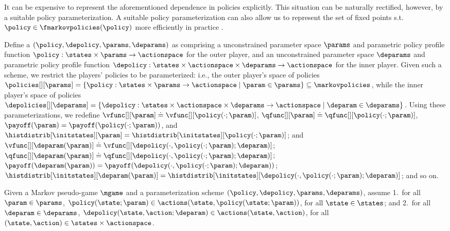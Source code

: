 It can be expensive to represent the aforementioned dependence in policies explicitly.
This situation can be naturally rectified, however, by a suitable policy parameterization. 
A suitable policy parameterization can also allow us to represent the set of fixed points s.t. $\policy \in \fmarkovpolicies (\policy)$ more efficiently in practice \cite{goktas2023generative}. 

Define a  $(\policy, \depolicy, \params, \deparams)$ as comprising a unconstrained parameter space $\params$ and parametric policy profile function $\policy: \states \times \params \to \actionspace$ for the outer player, and an unconstrained parameter space $\deparams$ and parametric policy profile function $\depolicy: \states\times \actionspace \times \deparams \to \actionspace$ for the inner player.
Given such a scheme, we restrict the players' policies to be parameterized: i.e., the outer player's space of policies $\policies[][\params] = \{ 
\policy: \states \times \params \to \actionspace \mid \param \in \params \} \subseteq \markovpolicies$, while the inner player's space of policies $\depolicies[][\deparams] = \{ \depolicy: \states\times \actionspace \times \deparams \to \actionspace
\mid \deparam \in \deparams \}$.
%
Using these parameterizations, we redefine $\vfunc[][\param] \doteq \vfunc[][{\policy (\cdot; \param)}]$, $\qfunc[][\param] \doteq \qfunc[][{\policy (\cdot; \param)}]$, $\payoff (\param) = \payoff ({\policy (\cdot; \param)})$, and $\histdistrib[\initstates][\param] = \histdistrib[\initstates][{\policy (\cdot; \param)}]$; and
$\vfunc[][\deparam(\param)] \doteq \vfunc[][{\depolicy (\cdot, \policy (\cdot; \param); \deparam)}]$; 
$\qfunc[][\deparam(\param)] \doteq \qfunc[][{\depolicy (\cdot, \policy (\cdot; \param); \deparam)}]$; $\payoff (\deparam(\param)) = \payoff ({\depolicy (\cdot, \policy (\cdot; \param); \deparam)})$; $\histdistrib[\initstates][\deparam(\param)] = \histdistrib[\initstates][{\depolicy (\cdot, \policy (\cdot; \param); \deparam)}]$; and so on.


\begin{assumption} 
\label{assum:param_min_max}
Given a Markov pseudo-game $\mgame$ and a parameterization scheme $(\policy, \depolicy, \params, \deparams)$, assume 
1.~for all $\param \in \params$, 
$\policy (\state; \param) \in \actions (\state, \policy (\state; \param))$, for all $\state \in \states$; and
2.~for all $\deparam \in \deparams$, 
$\depolicy (\state, \action; \deparam) \in \actions (\state, \action)$, for all $(\state, \action) \in \states\times \actionspace$. 
\end{assumption}

